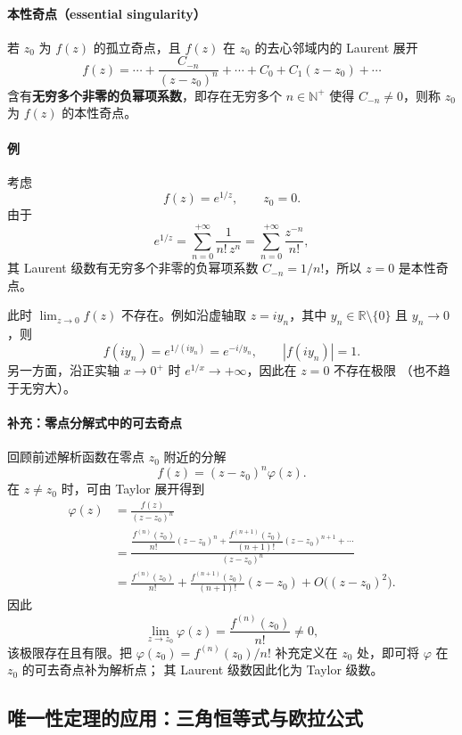 \paragraph{本性奇点（essential singularity）}
若 $z_0$ 为 $f(z)$ 的孤立奇点，且 $f(z)$ 在
$z_0$ 的去心邻域内的 Laurent 展开
\[
  f(z)=\cdots+\frac{C_{-n}}{(z-z_0)^n}
        +\cdots+C_0+C_1(z-z_0)+\cdots
\]
含有\textbf{无穷多个非零的负幂项系数}，即存在无穷多个
$n\in\mathbb N^+$ 使得 $C_{-n}\ne0$，则称 $z_0$
为 $f(z)$ 的本性奇点。

\paragraph{例}
考虑
\[
  f(z)=e^{1/z},\qquad z_0=0.
\]
由于
\[
  e^{1/z}
  =\sum_{n=0}^{+\infty}\frac{1}{n!\,z^n}
  =\sum_{n=0}^{+\infty}\frac{z^{-n}}{n!},
\]
其 Laurent 级数有无穷多个非零的负幂项系数
$C_{-n}=1/n!$，所以 $z=0$ 是本性奇点。

此时 $\lim_{z\to0}f(z)$ 不存在。例如沿虚轴取
$z=i y_n$，其中 $y_n\in\mathbb R\setminus\{0\}$
且 $y_n\to0$，则
\[
  f(iy_n)=e^{1/(iy_n)}=e^{-i/y_n},
  \qquad |f(iy_n)|=1.
\]
另一方面，沿正实轴 $x\to0^+$ 时
$e^{1/x}\to+\infty$，因此在 $z=0$ 不存在极限
（也不趋于无穷大）。

\paragraph{补充：零点分解式中的可去奇点}
回顾前述解析函数在零点 $z_0$ 附近的分解
\[
  f(z)=(z-z_0)^n\varphi(z).
\]
在 $z\ne z_0$ 时，可由 Taylor 展开得到
\begin{align*}
  \varphi(z)
   &=\frac{f(z)}{(z-z_0)^n}\\
   &=\frac{
      \dfrac{f^{(n)}(z_0)}{n!}(z-z_0)^n+
      \dfrac{f^{(n+1)}(z_0)}{(n+1)!}(z-z_0)^{n+1}
      +\cdots}{(z-z_0)^n}\\
   &=\frac{f^{(n)}(z_0)}{n!}
     +\frac{f^{(n+1)}(z_0)}{(n+1)!}(z-z_0)
     +O\bigl((z-z_0)^2\bigr).
\end{align*}
因此
\[
  \lim_{z\to z_0}\varphi(z)
  =\frac{f^{(n)}(z_0)}{n!}\ne0,
\]
该极限存在且有限。把
$\varphi(z_0)=f^{(n)}(z_0)/n!$ 补充定义在 $z_0$
处，即可将 $\varphi$ 在 $z_0$ 的可去奇点补为解析点；
其 Laurent 级数因此化为 Taylor 级数。


\subsection*{唯一性定理的应用：三角恒等式与欧拉公式}

